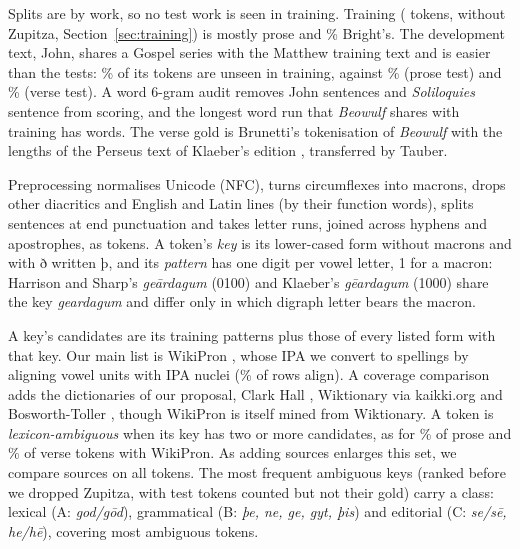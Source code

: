 \documentclass[11pt]{article}
\makeatletter
\renewcommand\section{\@startsection{section}{1}{\z@}{-2.5ex \@plus -.5ex \@minus -.2ex}{1.3ex \@plus .2ex}{\normalfont\Large\bfseries}}
\makeatother
\begin{document}
Splits are by work, so no test work is seen in training. Training (\NTrainTokens{} tokens, without Zupitza, Section~\ref{sec:training}) is mostly prose and \NPTrainBrightShare\% Bright's. The development text, John, shares a Gospel series with
the Matthew training text and is easier than the tests: \NPUnseenDev\% of its tokens are unseen in training, against
\NPUnseenSol\% (prose test) and \NPUnseenBeo\% (verse test). A word 6-gram audit removes \NLeakDevSent{} John
sentences and \NLeakSolSent{} \textit{Soliloquies} sentence from scoring, and the longest word run that
\textit{Beowulf} shares with training has \NPLongestRun{} words. The verse gold is Brunetti's tokenisation of
\textit{Beowulf} with the lengths of the Perseus text of Klaeber's edition \cite{klaeber1922}, transferred by Tauber.

\section{Preprocessing}\label{sec:prep}
Preprocessing normalises Unicode (NFC), turns circumflexes into macrons, drops other diacritics and English and Latin
lines (by their function words), splits sentences at end punctuation and takes letter runs, joined across hyphens and apostrophes, as
tokens. A token's \emph{key} is its lower-cased form without macrons and with ð written þ, and its
\emph{pattern} has one digit per vowel letter, 1 for a macron: Harrison and Sharp's \emph{geārdagum} (0100) and
Klaeber's \emph{gēardagum} (1000) share the key \emph{geardagum} and differ only in which digraph letter bears the macron.

A key's candidates are its training patterns plus those of every listed form with that key. Our main list is WikiPron
\cite{lee2020}, whose IPA we convert to spellings by aligning vowel units with IPA nuclei (\NWikiAligned\% of rows align). A coverage comparison adds the dictionaries of our proposal, Clark Hall \cite{clarkhall},
Wiktionary via kaikki.org \cite{ylonen2022} and Bosworth-Toller \cite{bosworth}, though WikiPron is itself mined from
Wiktionary. A token is \emph{lexicon-ambiguous}
when its key has two or more candidates, as for \NPLexShareSol\% of prose and \NPLexShareBeo\% of verse tokens with
WikiPron. As adding sources enlarges this set, we compare sources on all tokens. The \NPClassLabels{} most frequent
ambiguous keys (ranked before we dropped Zupitza, with test tokens counted but not their gold) carry a class: \NClassA{} lexical (A:
\emph{god/gōd}), \NClassB{} grammatical (B: \emph{þe, ne, ge, gyt, þis}) and \NClassC{} editorial (C: \emph{se/sē,
he/hē}), covering most ambiguous tokens.
\end{document}
